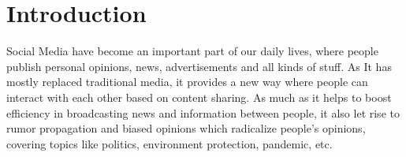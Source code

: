 \documentclass[sigplan,screen]{acmart}
\begin{document}



\maketitle

\section{Introduction}
Social Media have become an important part of our daily lives, where people publish personal opinions, news, advertisements and all kinds of stuff. As It has mostly replaced traditional media, it provides a new way where people can interact with each other based on content sharing. As much as it helps to boost efficiency in broadcasting news and information between people, it also let rise to rumor propagation and biased opinions which radicalize people's opinions, covering topics like politics, environment protection, pandemic, etc.
\end{document}
